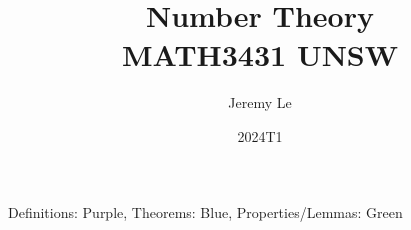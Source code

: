 \documentclass[12pt, letterpaper]{article}
\title{Number Theory \\ MATH3431 UNSW}
\author{Jeremy Le}
\date{2024T1}
\begin{document}
\maketitle

Definitions: Purple, Theorems: Blue, Properties/Lemmas: Green
\tableofcontents
\newpage





\end{document}
